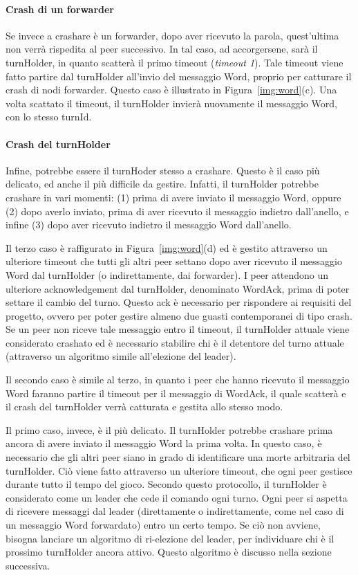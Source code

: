 \documentclass[10.5pt]{article}
\begin{document}
\paragraph{Crash di un forwarder}
Se invece a crashare è un forwarder, dopo aver ricevuto la parola, quest'ultima non verrà rispedita al peer successivo. In tal caso, ad accorgersene, sarà il turnHolder, in quanto scatterà il primo timeout (\emph{timeout 1}). Tale timeout viene fatto partire dal turnHolder all'invio del messaggio Word, proprio per catturare il crash di nodi forwarder. Questo caso è illustrato in Figura~\ref{img:word}(c). Una volta scattato il timeout, il turnHolder invierà nuovamente il messaggio Word, con lo stesso turnId.

\paragraph{Crash del turnHolder}
Infine, potrebbe essere il turnHoder stesso a crashare. Questo è il caso più delicato, ed anche il più difficile da gestire. Infatti, il turnHolder potrebbe crashare in vari momenti: (1) prima di avere inviato il messaggio Word, oppure (2) dopo averlo inviato, prima di aver ricevuto il messaggio indietro dall'anello, e infine (3) dopo aver ricevuto indietro il messaggio Word dall'anello.

Il terzo caso è raffigurato in Figura~\ref{img:word}(d) ed è gestito attraverso un ulteriore timeout che tutti gli altri peer settano dopo aver ricevuto il messaggio Word dal turnHolder (o indirettamente, dai forwarder). I peer attendono un ulteriore acknowledgement dal turnHolder, denominato WordAck, prima di poter settare il cambio del turno. Questo ack è necessario per rispondere ai requisiti del progetto, ovvero per poter gestire almeno due guasti contemporanei di tipo crash. Se un peer non riceve tale messaggio entro il timeout, il turnHolder attuale viene considerato crashato ed è necessario stabilire chi è il detentore del turno attuale (attraverso un algoritmo simile all'elezione del leader).

Il secondo caso è simile al terzo, in quanto i peer che hanno ricevuto il messaggio Word faranno partire il timeout per il messaggio di WordAck, il quale scatterà e il crash del turnHolder verrà catturata e gestita allo stesso modo.

Il primo caso, invece, è il più delicato. Il turnHolder potrebbe crashare prima ancora di avere inviato il messaggio Word la prima volta. In questo caso, è necessario che gli altri peer siano in grado di identificare una morte arbitraria del turnHolder. Ciò viene fatto attraverso un ulteriore timeout, che ogni peer gestisce durante tutto il tempo del gioco. Secondo questo protocollo, il turnHolder è considerato come un leader che cede il comando ogni turno. Ogni peer si aspetta di ricevere messaggi dal leader (direttamente o indirettamente, come nel caso di un messaggio Word forwardato) entro un certo tempo. Se ciò non avviene, bisogna lanciare un algoritmo di ri-elezione del leader, per individuare chi è il prossimo turnHolder ancora attivo. Questo algoritmo è discusso nella sezione successiva.
\end{document}
